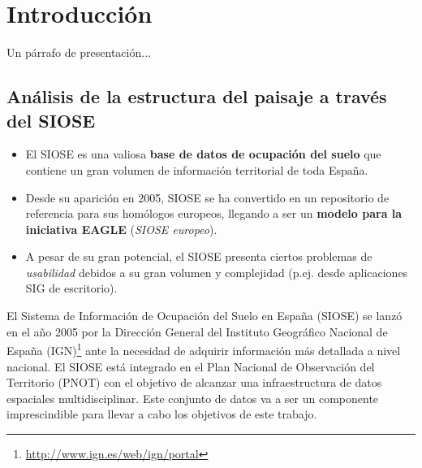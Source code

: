 
\chapter{Introducción}\label{chap:intro}

\ifpdf
    \graphicspath{{Introduccion/Figs/Raster/}{Introduccion/Figs/PDF/}{Introduccion/Figs/}}
\else
    \graphicspath{{Introduccion/Figs/Vector/}{Introduccion/Figs/}}
\fi


Un párrafo de presentación...


\section{Análisis de la estructura del paisaje a través del SIOSE}

\begin{graybox}
\begin{itemize}
\item El SIOSE es una valiosa \textbf{base de datos de ocupación del suelo} que contiene un gran volumen de información territorial de toda España.
\item Desde su aparición en 2005, SIOSE se ha convertido en un repositorio de referencia para sus homólogos europeos, llegando a ser un \textbf{modelo para la iniciativa EAGLE} (\textit{SIOSE europeo}). 
\item A pesar de su gran potencial, el SIOSE presenta ciertos problemas de \textit{usabilidad} debidos a su gran volumen y complejidad (p.ej. desde aplicaciones SIG de escritorio).
\end{itemize}
\end{graybox}


El Sistema de Información de Ocupación del Suelo en España (SIOSE) se lanzó en el año 2005 por la Dirección General del Instituto Geográfico Nacional de España (IGN)\footnote{\url{http://www.ign.es/web/ign/portal}} ante la necesidad de adquirir información más detallada a nivel nacional. El SIOSE está integrado en el Plan Nacional de Observación del Territorio (PNOT) con el objetivo de alcanzar una infraestructura de datos espaciales multidisciplinar. Este conjunto de datos va a ser un componente imprescindible para llevar a cabo los objetivos de este trabajo.

